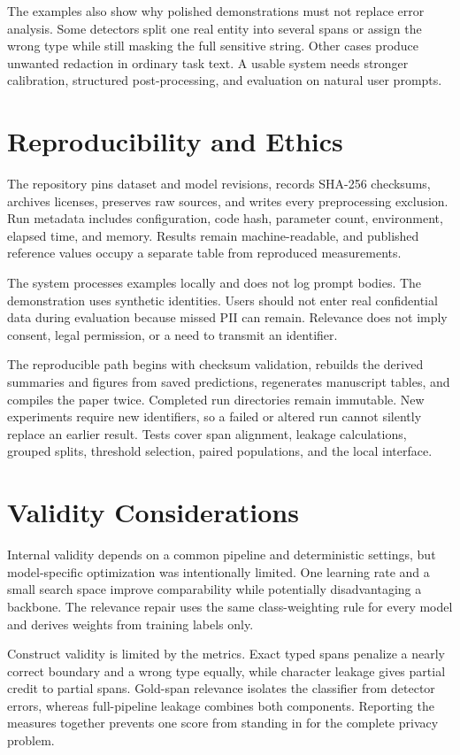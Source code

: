 \documentclass[conference]{IEEEtran}
\begin{document}
The examples also show why polished demonstrations must not replace error analysis. Some detectors split one real entity into several spans or assign the wrong type while still masking the full sensitive string. Other cases produce unwanted redaction in ordinary task text. A usable system needs stronger calibration, structured post-processing, and evaluation on natural user prompts.

\section{Reproducibility and Ethics}
The repository pins dataset and model revisions, records SHA-256 checksums, archives licenses, preserves raw sources, and writes every preprocessing exclusion. Run metadata includes configuration, code hash, parameter count, environment, elapsed time, and memory. Results remain machine-readable, and published reference values occupy a separate table from reproduced measurements.

The system processes examples locally and does not log prompt bodies. The demonstration uses synthetic identities. Users should not enter real confidential data during evaluation because missed PII can remain. Relevance does not imply consent, legal permission, or a need to transmit an identifier.

The reproducible path begins with checksum validation, rebuilds the derived summaries and figures from saved predictions, regenerates manuscript tables, and compiles the paper twice. Completed run directories remain immutable. New experiments require new identifiers, so a failed or altered run cannot silently replace an earlier result. Tests cover span alignment, leakage calculations, grouped splits, threshold selection, paired populations, and the local interface.

\balance
\section{Validity Considerations}
Internal validity depends on a common pipeline and deterministic settings, but model-specific optimization was intentionally limited. One learning rate and a small search space improve comparability while potentially disadvantaging a backbone. The relevance repair uses the same class-weighting rule for every model and derives weights from training labels only.

Construct validity is limited by the metrics. Exact typed spans penalize a nearly correct boundary and a wrong type equally, while character leakage gives partial credit to partial spans. Gold-span relevance isolates the classifier from detector errors, whereas full-pipeline leakage combines both components. Reporting the measures together prevents one score from standing in for the complete privacy problem.
\end{document}

